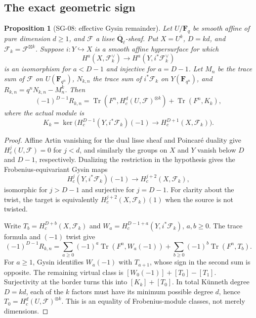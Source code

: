 \documentclass[11pt,a4paper]{article}
\newtheorem{proposition}[theorem]{Proposition}
\theoremstyle{remark}
\begin{document}
\subsection{The exact geometric sign}

\begin{proposition}[SG-08: effective Gysin remainder]
\label{prop:gysin}
Let $U/\mathbf F_q$ be smooth affine of pure dimension $d\ge1$, and
$\mathcal F$ a lisse $\overline{\mathbf Q}_\ell$-sheaf.  Put
$X=U^k$, $D=kd$, and $\mathcal F_k=\mathcal F^{\boxtimes k}$.
Suppose $i:Y\hookrightarrow X$ is a smooth affine hypersurface for which
\[
 H^a(X,\mathcal F_k^\vee)\longrightarrow
 H^a(Y,i^*\mathcal F_k^\vee)
\]
is an isomorphism for $a<D-1$ and injective for $a=D-1$.
Let $M_n$ be the trace sum of $\mathcal F$ on $U(\mathbf F_{q^n})$,
$N_{k,n}$ the trace sum of $i^*\mathcal F_k$ on $Y(\mathbf F_{q^n})$,
and $R_{k,n}=q^nN_{k,n}-M_n^k$.  Then
\begin{equation}\label{eq:effective}
 (-1)^{D-1}R_{k,n}
   =\operatorname{Tr}(F^n,H_c^d(U,\mathcal F)^{\otimes k})
      +\operatorname{Tr}(F^n,K_k),
\end{equation}
where the actual module is
\begin{equation}\label{eq:kernel}
 K_k=\ker\bigl(H_c^{D-1}(Y,i^*\mathcal F_k)(-1)
                    \longrightarrow H_c^{D+1}(X,\mathcal F_k)\bigr).
\end{equation}
\end{proposition}
\begin{proof}
Affine Artin vanishing for the dual lisse sheaf and Poincar\'e duality
give $H_c^j(U,\mathcal F)=0$ for $j<d$, and similarly the groups on
$X$ and $Y$ vanish below $D$ and $D-1$, respectively.
Dualizing the restriction in the hypothesis gives the Frobenius-equivariant
Gysin maps
\[
 H_c^j(Y,i^*\mathcal F_k)(-1)\longrightarrow
 H_c^{j+2}(X,\mathcal F_k),
\]
isomorphic for $j>D-1$ and surjective for $j=D-1$.
For clarity about the twist, the target is equivalently
$H_c^{j+2}(X,\mathcal F_k)(1)$ when the source is not twisted.

Write $T_b=H_c^{D+b}(X,\mathcal F_k)$ and
$W_a=H_c^{D-1+a}(Y,i^*\mathcal F_k)$, $a,b\ge0$.
The trace formula and $(-1)$ twist give
\[
 (-1)^{D-1}R_{k,n}
 =\sum_{a\ge0}(-1)^a\operatorname{Tr}(F^n,W_a(-1))
   +\sum_{b\ge0}(-1)^b\operatorname{Tr}(F^n,T_b).
\]
For $a\ge1$, Gysin identifies $W_a(-1)$ with $T_{a+1}$, whose sign in
the second sum is opposite.  The remaining virtual class is
$[W_0(-1)]+[T_0]-[T_1]$.  Surjectivity at the border turns this into
$[K_k]+[T_0]$.  In total K\"unneth degree $D=kd$, each of the $k$ factors
must have its minimum possible degree $d$, hence
$T_0=H_c^d(U,\mathcal F)^{\otimes k}$.
This is an equality of Frobenius-module classes, not merely dimensions.
\end{proof}
\end{document}
